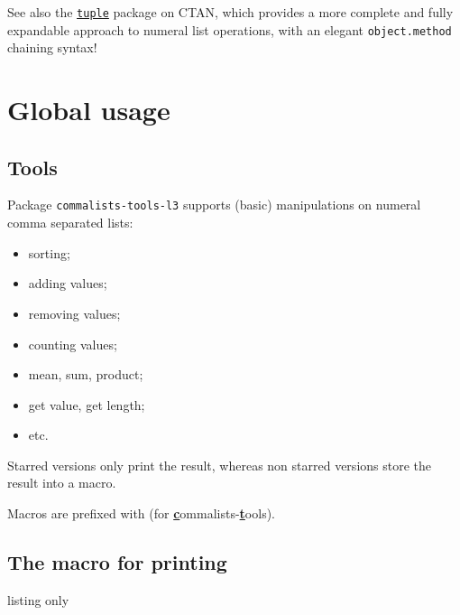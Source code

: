 \documentclass[11pt,a4paper]{ltxdoc}
\begin{document}
{\footnotesize\faLightbulb} See also the \href{https://ctan.org/pkg/tuple}{\texttt{tuple}} package on CTAN, which provides a more complete and fully expandable approach to numeral list operations, with an elegant \texttt{object.method} chaining syntax!

\section{Global usage}

\subsection{Tools}

Package \texttt{commalists-tools-l3} supports (basic) manipulations on numeral comma separated lists:

\begin{itemize}
	\item sorting;
	\item adding values;
	\item removing values;
	\item counting values;
	\item mean, sum, product;
	\item get value, get length;
	\item etc.
\end{itemize}

Starred versions only print the result, whereas non starred versions store the result into a macro.

\medskip

{\small\faLightbulb} Macros are prefixed with  (for \textsf{\textbf{\underline{c}}ommalists-\textbf{\underline{t}}ools}).

\subsection{The macro for printing}

\begin{DemoCode}{listing only}
\end{DemoCode}

\begin{DemoCode}{}
\end{DemoCode}

\begin{DemoCode}{}
\def\mytmplist{12, -4,   5,7 ,8, 9, 0}
\ctshowlist[\,/\,]{\mytmplist}
\end{DemoCode}
\end{document}
